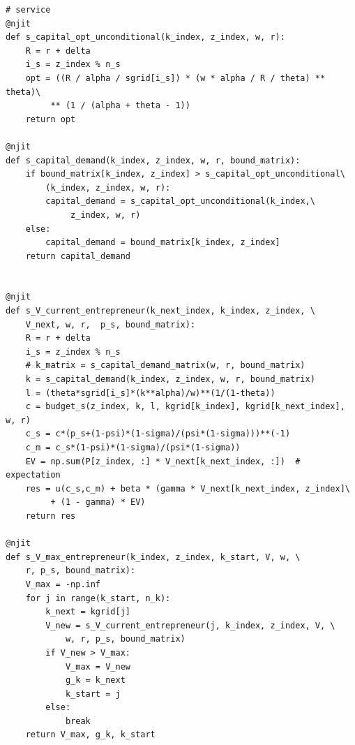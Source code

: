 \documentclass[a4paper, 12pt]{ctexart}
\begin{document}
\begin{lstlisting}
# service
@njit
def s_capital_opt_unconditional(k_index, z_index, w, r):
    R = r + delta
    i_s = z_index % n_s
    opt = ((R / alpha / sgrid[i_s]) * (w * alpha / R / theta) ** theta)\
         ** (1 / (alpha + theta - 1))
    return opt

@njit
def s_capital_demand(k_index, z_index, w, r, bound_matrix):
    if bound_matrix[k_index, z_index] > s_capital_opt_unconditional\
        (k_index, z_index, w, r):
        capital_demand = s_capital_opt_unconditional(k_index,\
             z_index, w, r)
    else:
        capital_demand = bound_matrix[k_index, z_index]
    return capital_demand


@njit
def s_V_current_entrepreneur(k_next_index, k_index, z_index, \
    V_next, w, r,  p_s, bound_matrix):
    R = r + delta
    i_s = z_index % n_s
    # k_matrix = s_capital_demand_matrix(w, r, bound_matrix)
    k = s_capital_demand(k_index, z_index, w, r, bound_matrix)
    l = (theta*sgrid[i_s]*(k**alpha)/w)**(1/(1-theta))
    c = budget_s(z_index, k, l, kgrid[k_index], kgrid[k_next_index], w, r)
    c_s = c*(p_s+(1-psi)*(1-sigma)/(psi*(1-sigma)))**(-1)
    c_m = c_s*(1-psi)*(1-sigma)/(psi*(1-sigma))
    EV = np.sum(P[z_index, :] * V_next[k_next_index, :])  # expectation
    res = u(c_s,c_m) + beta * (gamma * V_next[k_next_index, z_index]\
         + (1 - gamma) * EV)
    return res

@njit
def s_V_max_entrepreneur(k_index, z_index, k_start, V, w, \
    r, p_s, bound_matrix):
    V_max = -np.inf
    for j in range(k_start, n_k):
        k_next = kgrid[j]
        V_new = s_V_current_entrepreneur(j, k_index, z_index, V, \
            w, r, p_s, bound_matrix)
        if V_new > V_max:
            V_max = V_new
            g_k = k_next
            k_start = j
        else:
            break
    return V_max, g_k, k_start
\end{lstlisting}
\end{document}
